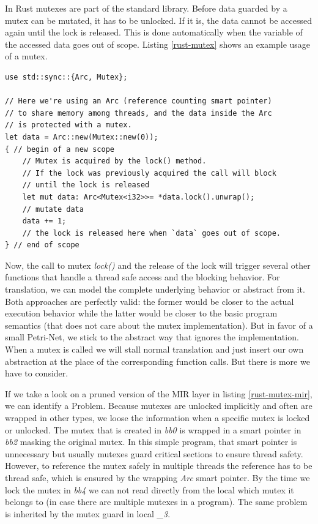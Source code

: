 In Rust mutexes are part of the standard library.
Before data guarded by a mutex can be mutated, it has to be unlocked.
If it is, the data cannot be accessed again until the lock is released.
This is done automatically when the variable of the accessed data goes out of scope.
Listing \ref{rust-mutex} shows an example usage of a mutex.

\begin{lstlisting}
use std::sync::{Arc, Mutex};

// Here we're using an Arc (reference counting smart pointer)
// to share memory among threads, and the data inside the Arc
// is protected with a mutex.
let data = Arc::new(Mutex::new(0));
{ // begin of a new scope
    // Mutex is acquired by the lock() method.
    // If the lock was previously acquired the call will block
    // until the lock is released
    let mut data: Arc<Mutex<i32>>= *data.lock().unwrap();
    // mutate data
    data += 1;
    // the lock is released here when `data` goes out of scope.
} // end of scope
\end{lstlisting}

Now, the call to mutex \textit{lock()} and the release of the lock will trigger several other functions that handle a thread safe access and the blocking behavior.
For translation, we can model the complete underlying behavior or abstract from it.
Both approaches are perfectly valid: the former would be closer to the actual execution behavior while the latter would be closer to the basic program semantics (that does not care about the mutex implementation).
But in favor of a small Petri-Net, we stick to the abstract way that ignores the implementation.
When a mutex is called we will stall normal translation and just insert our own abstraction at the place of the corresponding function calls.
But there is more we have to consider.

If we take a look on a pruned version of the MIR layer in listing \ref{rust-mutex-mir}, we can identify a Problem.
Because mutexes are unlocked implicitly and often are wrapped in other types, we loose the information when a specific mutex is locked or unlocked.
The mutex that is created in \textit{bb0} is wrapped in a smart pointer in \textit{bb2} masking the original mutex.
In this simple program, that smart pointer is unnecessary but usually mutexes guard critical sections to ensure thread safety.
However, to reference the mutex safely in multiple threads the reference has to be thread safe, which is ensured by the wrapping \textit{Arc} smart pointer.
By the time we lock the mutex in \textit{bb4} we can not read directly from the local which mutex it belongs to (in case there are multiple mutexes in a program).
The same problem is inherited by the mutex guard in local \textit{\_3}.

